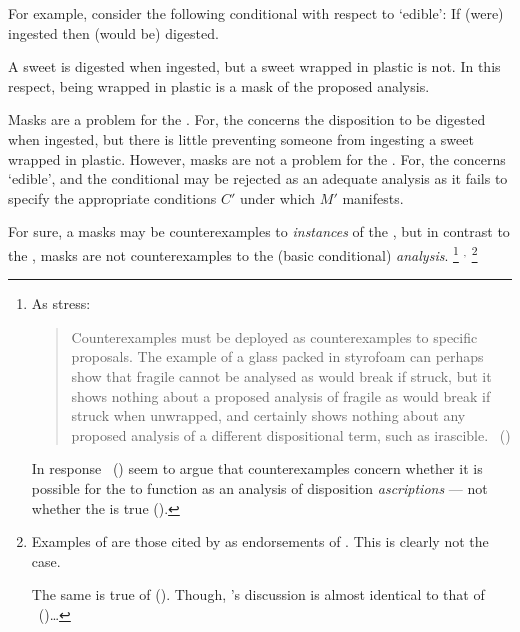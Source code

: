 \begin{note}
  For example, consider the following conditional with respect to `edible':
  If (were) ingested then (would be) digested.

  A sweet is digested when ingested, but a sweet wrapped in plastic is not.
  In this respect, being wrapped in plastic is a mask of the proposed analysis.

  Masks are a problem for the \dSCAa{}.
  For, the \dSCAa{} concerns the disposition to be digested when ingested, but there is little preventing someone from ingesting a sweet wrapped in plastic.
  However, masks are not a problem for the \dBCAa{}.
  For, the \dBCAa{} concerns `edible', and the conditional may be rejected as an adequate analysis as it fails to specify the appropriate conditions \(C'\) under which \(M'\) manifests.

  For sure, a masks may be counterexamples to \emph{instances} of the \dBCAa{}, but in contrast to the \dSCAa{}, masks are not counterexamples to the (basic conditional) \emph{analysis}.%
  \footnote{
    As \citeauthor{Bonevac:2011tz} stress:
    \begin{quote}
      Counterexamples must be deployed as counterexamples to specific proposals.
      The example of a glass packed in styrofoam can perhaps show that fragile cannot be analysed as would break if struck, but it shows nothing about a proposed analysis of fragile as would break if struck when unwrapped, and certainly shows nothing about any proposed analysis of a different dispositional term, such as irascible.%
      \mbox{ }\hfill\mbox{(\citeyear[1144]{Bonevac:2011tz})}
    \end{quote}

    \nocite{Manley:2007aa}
    In response~\citeauthor{Manley:2011aa} (\citeyear{Manley:2011aa}) seem to argue that counterexamples concern whether it is possible for the  to function as an analysis of disposition \emph{ascriptions} --- not whether the  is true (\citeyear[cf.][\S1.3]{Manley:2011aa}).
  }%
  \(^{,}\)%
  \footnote{
    Examples of  are those cited by \citeauthor{Choi:2021wg} as endorsements of .
    This is clearly not the case.

    The same is true of \citeauthor{Manley:2008aa} (\citeyear[60]{Manley:2008aa}).
    Though, \citeauthor{Manley:2008aa}'s discussion is almost identical to that of \citeauthor{Fara:2006aa}~(\citeyear[\S2.1]{Fara:2006aa})\dots

}
\end{note}
